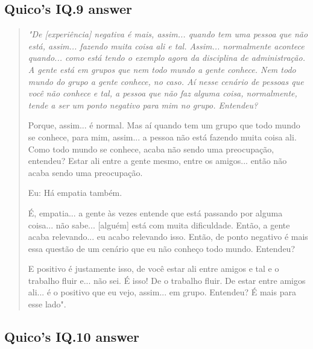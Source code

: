 \subsection{Quico’s IQ.9 answer}
\label{interview-exc-ss:quico-iq9}

\begin{quote}
    \itshape
    "De [experiência] negativa é mais, assim... quando tem uma pessoa que não está, assim... fazendo muita coisa ali e tal. Assim... normalmente acontece quando... como está tendo o exemplo agora da disciplina de administração. A gente está em grupos que nem todo mundo a gente conhece. Nem todo mundo do grupo a gente conhece, no caso. Aí nesse cenário de pessoas que você não conhece e tal, a pessoa que não faz alguma coisa, normalmente, tende a ser um ponto negativo para mim no grupo. Entendeu? 
    
    Porque, assim... é normal. Mas aí quando tem um grupo que todo mundo se conhece, para mim, assim... a pessoa não está fazendo muita coisa ali. Como todo mundo se conhece, acaba não sendo uma preocupação, entendeu? Estar ali entre a gente mesmo, entre os amigos... então não acaba sendo uma preocupação. 

    
    \colorbox{black!15}{Eu: Há empatia também.}
    
    É, empatia... a gente às vezes entende que está passando por alguma coisa... não sabe... [alguém] está com muita dificuldade. Então, a gente acaba relevando... eu acabo relevando isso. Então, de ponto negativo é mais essa questão de um cenário que eu não conheço todo mundo. Entendeu? 
    
    E positivo é justamente isso, de você estar ali entre amigos e tal e o trabalho fluir e... não sei. É isso! De o trabalho fluir. De estar entre amigos ali... é o positivo que eu vejo, assim... em grupo. Entendeu? É mais para esse lado".
\end{quote}

\subsection{Quico’s IQ.10 answer}
\label{interview-exc-ss:quico-iq10}

